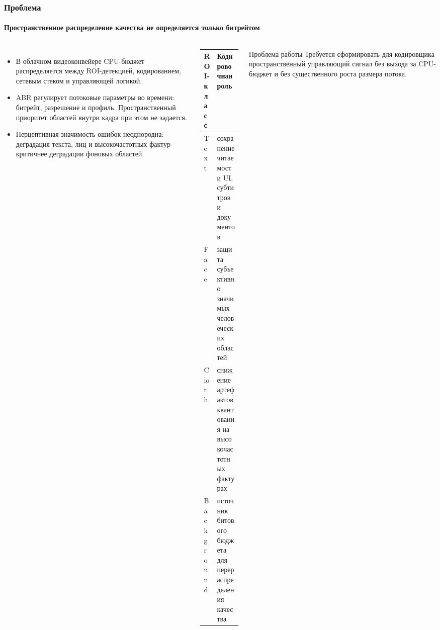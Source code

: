 \documentclass[aspectratio=169,10pt]{beamer}
\newcommand{\thead}[1]{\textbf{#1}}
\newcommand{\aftertablegap}{\vspace{0.90em}}
\begin{document}
\begin{frame}
\frametitle{Проблема}
\framesubtitle{Пространственное распределение качества не определяется только битрейтом}
\footnotesize
\begin{columns}[T,onlytextwidth]
  \begin{itemize}
    \item В облачном видеоконвейере CPU-бюджет распределяется между ROI-детекцией, кодированием, сетевым стеком и управляющей логикой.
    \item ABR регулирует потоковые параметры во времени: битрейт, разрешение и профиль. Пространственный приоритет областей внутри кадра при этом не задается.
    \item Перцептивная значимость ошибок неоднородна: деградация текста, лиц и высокочастотных фактур критичнее деградации фоновых областей.
  \end{itemize}
  \begin{table}
  \scriptsize
  \begin{tabularx}{\linewidth}{@{}P{0.25\linewidth}Y@{}}
    \toprule
    \thead{ROI-класс} & \thead{Кодировочная роль} \\
    \midrule
    Text & сохранение читаемости UI, субтитров и документов \\
    \addlinespace[0.12em]
    Face & защита субъективно значимых человеческих областей \\
    \addlinespace[0.12em]
    Cloth & снижение артефактов квантования на высокочастотных фактурах \\
    \addlinespace[0.12em]
    Background & источник битового бюджета для перераспределения качества \\
    \bottomrule
  \end{tabularx}
  \end{table}
  \aftertablegap
  \begin{block}{Проблема работы}
    Требуется сформировать для кодировщика пространственный управляющий сигнал без выхода за CPU-бюджет и без существенного роста размера потока.
  \end{block}
\end{columns}
\end{frame}
\end{document}
